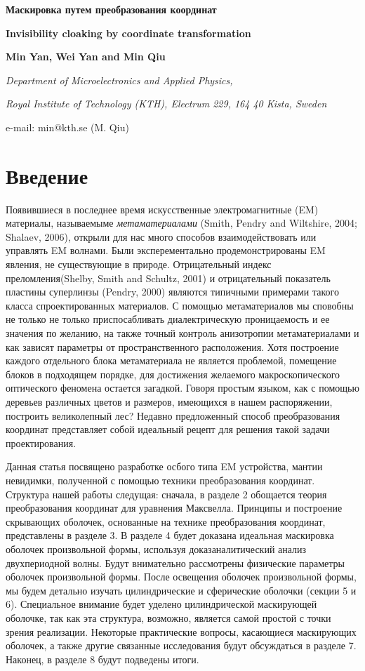 \documentclass[12pt,a4paper]{article}
\newcommand{\tit}[1]{\begin{center}{\bf{\Large #1}}\end{center}}
\newcommand{\aut}[1]{\centerline{{\bf #1}}}
\newcommand{\cityorg}[1]{\centerline{\it #1}}
\newcommand{\email}[1]{\centerline{{\small e-mail: #1}}\vspace{\baselineskip}}
\begin{document}
\sloppy
 
 \tit{Маскировка путем преобразования координат}
 \tit{Invisibility cloaking by coordinate transformation}
 \aut{Min Yan, Wei Yan and Min Qiu}
 \cityorg{Department of Microelectronics and Applied Physics,}
 \cityorg{Royal Institute of Technology (KTH), Electrum 229, 164 40 Kista, Sweden}
 \email{min@kth.se (M. Qiu)}

\section{Введение}
Появившиеся в последнее время искусственные электромагнитные (EM) материалы, называемыме 
\textit{метаматериалами} (Smith, Pendry and Wiltshire, 2004; Shalaev, 2006), открыли для нас
много способов взаимодействовать или управлять EM волнами. Были эксперементально продемонстрированы EM
явления, не существующие в природе. Отрицательный индекс преломления(Shelby, Smith and Schultz, 2001)
и отрицательный показатель пластины суперлинзы (Pendry, 2000) являются типичными примерами такого класса
спроектированных материалов. С помощью метаматериалов мы сповобны не только не только приспосабливать 
диалектрическую проницаемость и ее значения по желанию, на также точный контроль анизотропии 
метаматериалами и как зависят параметры от пространственного расположения. Хотя построение каждого 
отдельного блока метаматериала не является проблемой, помещение блоков в подходящем порядке, для 
достижения желаемого макроскопического оптического феномена остается загадкой. Говоря простым языком,
как с помощью деревьев различных цветов и размеров, имеющихся в нашем распоряжении, построить великолепный
лес? Недавно предложенный способ преобразования координат представляет собой идеальный рецепт для
решения такой задачи проектирования.

Данная статья посвящено разработке осбого типа EM устройства, мантии невидимки, полученной с помощью
техники преобразования координат. Структура нашей работы следущая: сначала, в разделе 2 обощается
теория преобразования координат для уравнения Максвелла. Принципы и построение скрывающих оболочек,
основанные на технике преобразования координат, представлены в разделе 3. В разделе 4 будет доказана
идеальная маскировка оболочек произвольной формы, используя доказаналитический анализ двухпериодной волны.
Будут внимательно рассмотрены физические параметры оболочек произвольной формы. После освещения
оболочек произвольной формы, мы будем детально изучать цилиндрические и сферические оболочки 
(секции 5 и 6). Специальное внимание будет уделено цилиндрической маскирующей оболочке, так как эта 
структура, возможно, является самой простой с точки зрения реализации. Некоторые практические вопросы,
касающиеся маскирующих оболочек, а также другие связанные исследования будут обсуждаться в разделе 7.
Наконец, в разделе 8 будут подведены итоги.
\end{document}
